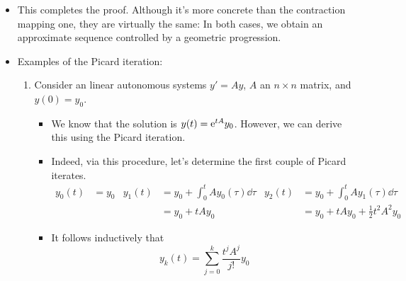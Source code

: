 \documentclass[../notes.tex]{subfiles}
\begin{document}
\begin{itemize}
    \item This completes the proof. Although it's more concrete than the contraction mapping one, they are virtually the same: In both cases, we obtain an approximate sequence controlled by a geometric progression.
    \item Examples of the Picard iteration:
    \begin{enumerate}
        \item Consider an linear autonomous systems $y'=Ay$, $A$ an $n\times n$ matrix, and $y(0)=y_0$.
        \begin{itemize}
            \item We know that the solution is $y(t)=\e[tA]y_0$. However, we can derive this using the Picard iteration.
            \item Indeed, via this procedure, let's determine the first couple of Picard iterates.
            \begin{align*}
                y_0(t) &= y_0&
                    y_1(t) &= y_0+\int_0^tAy_0(\tau)\dd\tau&
                        y_2(t) &= y_0+\int_0^tAy_1(\tau)\dd\tau\\
                &&
                    &= y_0+tAy_0&
                        &= y_0+tAy_0+\frac{1}{2}t^2A^2y_0
            \end{align*}
            \item It follows inductively that
            \begin{equation*}
                y_k(t) = \sum_{j=0}^k\frac{t^jA^j}{j!}y_0
            \end{equation*}

\end{itemize}
\end{enumerate}
\end{itemize}
\end{document}
